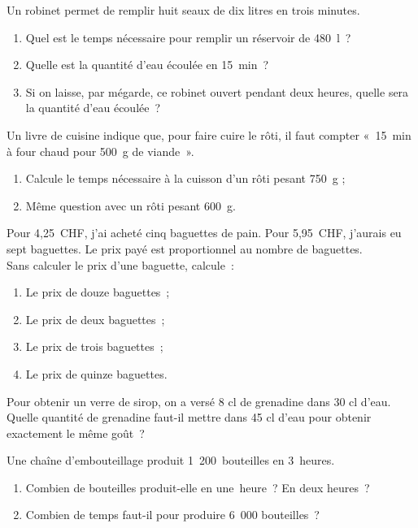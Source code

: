 \begin{exercice}
Un robinet permet de remplir huit seaux de dix litres en trois minutes.
\begin{enumerate}
 \item Quel est le temps nécessaire pour remplir un réservoir de 480 l ?
 \item Quelle est la quantité d'eau écoulée en 15 min ?
 \item Si on laisse, par mégarde, ce robinet ouvert pendant deux heures, quelle sera la quantité d'eau écoulée ?
 \end{enumerate}
\end{exercice}


\begin{exercice}[Cuisson]
Un livre de cuisine indique que, pour faire cuire le rôti, il faut compter « 15 min à four chaud pour 500 g de viande ».
\begin{enumerate}
 \item Calcule le temps nécessaire à la cuisson d'un rôti pesant 750 g ;
 \item Même question avec un rôti pesant 600 g.
 \end{enumerate}
\end{exercice}


\begin{exercice}
Pour 4,25 CHF, j'ai acheté cinq baguettes de pain. Pour 5,95 CHF, j'aurais eu sept baguettes. Le prix payé est proportionnel au nombre de baguettes. \\[0.5em]
Sans calculer le prix d'une baguette, calcule :
\begin{enumerate}
 \item Le prix de douze baguettes ;
 \item Le prix de deux baguettes ;
 \item Le prix de trois baguettes ;
 \item Le prix de quinze baguettes.
 \end{enumerate}
\end{exercice}


\begin{exercice}
Pour obtenir un verre de sirop, on a versé 8 cl de grenadine dans 30 cl d’eau. \\[0.5em]
Quelle quantité de grenadine faut-il mettre dans 45 cl d’eau pour obtenir exactement le même goût ?
\end{exercice}


\begin{exercice}
Une chaîne d’embouteillage produit 1 200 bouteilles en 3 heures.
\begin{enumerate}
 \item Combien de bouteilles produit-elle en une heure ? En deux heures ?
 \item Combien de temps faut-il pour produire 6 000 bouteilles ?
 \end{enumerate}
\end{exercice}


